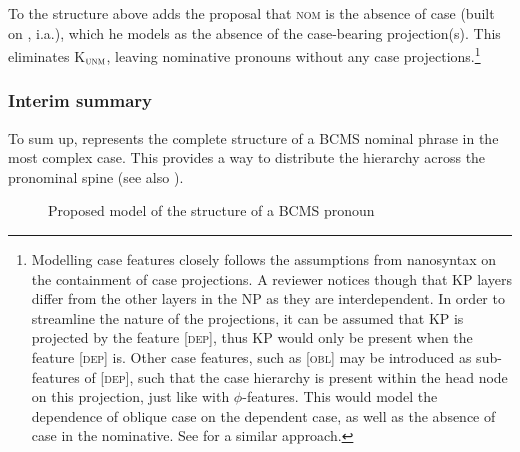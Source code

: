 \documentclass[output=paper,colorlinks,citecolor=brown]{langscibook}
\begin{document}
\noindent To the structure above \citet{mcfadden18} adds the proposal that \textsc{nom} is the absence of case (built on \citealt{bittnerhale96,tomsandhya09}, i.a.), which he models as the absence of the case-bearing projection(s). This eliminates K$_{\textsc{unm}}$, leaving nominative pronouns without any case projections.\footnote{Modelling case features closely follows the assumptions from nanosyntax on the containment of case projections. A reviewer notices though that KP layers differ from the other layers in the NP as they are interdependent. In order to streamline the nature of the projections, it can be assumed that KP is projected by the feature [\textsc{dep}], thus KP would only be present when the feature [\textsc{dep}] is. Other case features, such as [\textsc{obl}] may be introduced as sub-features of [\textsc{dep}], such that the case hierarchy is present within the head node on this projection, just like with $\phi$-features. This would model the dependence of oblique case on the dependent case, as well as the absence of case in the nominative. See \citet{barany17book} for a similar approach.} 

\subsubsection{Interim summary}\label{subsubsec:interimsummary}

To sum up,  represents the complete structure of a BCMS nominal  phrase in the most complex case. This provides a way to distribute the \citet{harleyritter02} hierarchy across the pronominal spine (see also \citealt{vankoppen12,fassifehri2000}).

\begin{figure}
    \caption{Proposed model of the structure of a BCMS pronoun}
    \label{fig:complete}
\end{figure}
\end{document}
